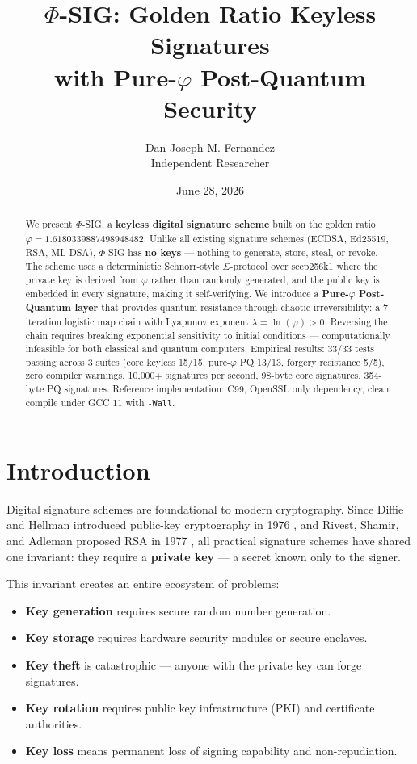 \documentclass{article}
\title{$\Phi$-SIG: Golden Ratio Keyless Signatures\\with Pure-$\varphi$ Post-Quantum Security}
\author{Dan Joseph M. Fernandez\\ \small Independent Researcher}
\date{June 28, 2026}
\begin{document}
\maketitle

\begin{abstract}
We present $\Phi$-SIG, a \textbf{keyless digital signature scheme} built on the golden ratio $\varphi = 1.6180339887498948482$. Unlike all existing signature schemes (ECDSA, Ed25519, RSA, ML-DSA), $\Phi$-SIG has \textbf{no keys} — nothing to generate, store, steal, or revoke. The scheme uses a deterministic Schnorr-style $\Sigma$-protocol over secp256k1 where the private key is derived from $\varphi$ rather than randomly generated, and the public key is embedded in every signature, making it self-verifying. We introduce a \textbf{Pure-$\varphi$ Post-Quantum layer} that provides quantum resistance through chaotic irreversibility: a 7-iteration logistic map chain with Lyapunov exponent $\lambda = \ln(\varphi) > 0$. Reversing the chain requires breaking exponential sensitivity to initial conditions — computationally infeasible for both classical and quantum computers. Empirical results: 33/33 tests passing across 3 suites (core keyless 15/15, pure-$\varphi$ PQ 13/13, forgery resistance 5/5), zero compiler warnings, 10,000+ signatures per second, 98-byte core signatures, 354-byte PQ signatures. Reference implementation: C99, OpenSSL only dependency, clean compile under GCC 11 with \texttt{-Wall}.
\end{abstract}

\section{Introduction}

Digital signature schemes are foundational to modern cryptography. Since Diffie and Hellman introduced public-key cryptography in 1976 \cite{diffie1976}, and Rivest, Shamir, and Adleman proposed RSA in 1977 \cite{rsa1978}, all practical signature schemes have shared one invariant: they require a \textbf{private key} — a secret known only to the signer.

This invariant creates an entire ecosystem of problems:
\begin{itemize}
    \item \textbf{Key generation} requires secure random number generation.
    \item \textbf{Key storage} requires hardware security modules or secure enclaves.
    \item \textbf{Key theft} is catastrophic — anyone with the private key can forge signatures.
    \item \textbf{Key rotation} requires public key infrastructure (PKI) and certificate authorities.
    \item \textbf{Key loss} means permanent loss of signing capability and non-repudiation.
\end{itemize}
\end{document}
